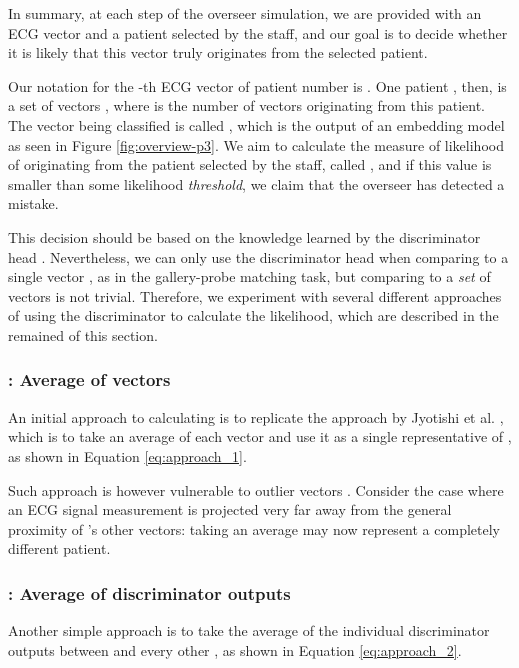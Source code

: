 \documentclass[preprint,12pt]{elsarticle}
\begin{document}
In summary, at each step of the overseer simulation, we are provided with an ECG vector and a patient selected by the staff, and our goal is to decide whether it is likely that this vector truly originates from the selected patient.

Our notation for the -th ECG vector of patient number  is . One patient , then, is a set of vectors , where  is the number of vectors originating from this patient. The vector being classified is called , which is the output of an embedding model as seen in Figure \ref{fig:overview-p3}. We aim to calculate the measure of likelihood of  originating from the patient  selected by the staff, called , and if this value is smaller than some likelihood \textit{threshold}, we claim that the overseer has detected a mistake.

This decision should be based on the knowledge learned by the discriminator head . Nevertheless, we can only use the discriminator head when comparing  to a single vector , as in the gallery-probe matching task, but comparing  to a \textit{set} of vectors  is not trivial. Therefore, we experiment with several different approaches of using the discriminator to calculate the likelihood, which are described in the remained of this section.







\subsubsection{\aA: Average of vectors}
An initial approach to calculating  is to replicate the approach by Jyotishi et al. \cite{jyotishi2021ecg}, which is to take an average of each vector  and use it as a single representative of , as shown in Equation \ref{eq:approach_1}.



Such approach is however vulnerable to outlier vectors . Consider the case where an ECG signal measurement  is projected very far away from the general proximity of 's other vectors: taking an average may now represent a completely different patient.

\subsubsection{\aB: Average of discriminator outputs}
Another simple approach is to take the average of the individual discriminator outputs between  and every other , as shown in Equation \ref{eq:approach_2}.
\end{document}

